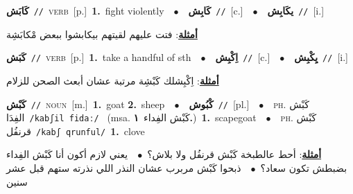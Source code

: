 \documentclass[10pt,a4paper,twoside]{article} %
\begin{document}
\begin{multicols}{2}
{\setlength\topsep{0pt}\textbf{\foreignlanguage{arabic}{كَابَش}}\ {\color{gray}\texttt{//}\color{black}}\ \textsc{verb}\ [p.]\ \textbf{1.}~fight violently\ \ $\bullet$\ \ \setlength\topsep{0pt}\textbf{\foreignlanguage{arabic}{كَابِش}}\ {\color{gray}\texttt{//}\color{black}}\ [c.]\ \ $\bullet$\ \ \setlength\topsep{0pt}\textbf{\foreignlanguage{arabic}{يكَابِش}}\ {\color{gray}\texttt{//}\color{black}}\ [i.]\  \begin{flushright}\color{gray}\foreignlanguage{arabic}{\textbf{\underline{\foreignlanguage{arabic}{أمثلة}}}: فتت عليهم لقيتهم بيكابشوا ببعض مْكابَشِة}\end{flushright}\color{black}} \vspace{2mm}

{\setlength\topsep{0pt}\textbf{\foreignlanguage{arabic}{كَبَش}}\ {\color{gray}\texttt{//}\color{black}}\ \textsc{verb}\ [p.]\ \textbf{1.}~take a handful of sth\ \ $\bullet$\ \ \setlength\topsep{0pt}\textbf{\foreignlanguage{arabic}{اِكْبِش}}\ {\color{gray}\texttt{//}\color{black}}\ [c.]\ \ $\bullet$\ \ \setlength\topsep{0pt}\textbf{\foreignlanguage{arabic}{يِكْبِش}}\ {\color{gray}\texttt{//}\color{black}}\ [i.]\  \begin{flushright}\color{gray}\foreignlanguage{arabic}{\textbf{\underline{\foreignlanguage{arabic}{أمثلة}}}: اِكْبِشلك كَبْشِة مرتبة عشان أبعث الصحن للزلام}\end{flushright}\color{black}} \vspace{2mm}

{\setlength\topsep{0pt}\textbf{\foreignlanguage{arabic}{كَبْش}}\ {\color{gray}\texttt{//}\color{black}}\ \textsc{noun}\ [m.]\ \textbf{1.}~goat  \textbf{2.}~sheep\ \ $\bullet$\ \ \setlength\topsep{0pt}\textbf{\foreignlanguage{arabic}{كْبُوش}}\ {\color{gray}\texttt{//}\color{black}}\ [pl.]\ \ $\bullet$\ \ \textsc{ph.} \color{gray} \foreignlanguage{arabic}{كَبْش الفِدَا}\color{black}\ {\color{gray}\texttt{/{\sffamily kabʃil fidaː}/}\color{black}}\ \color{gray} (msa. \foreignlanguage{arabic}{كَبْش الفِداء}~\foreignlanguage{arabic}{\textbf{١.}})\color{black}\ \textbf{1.}~scapegoat\ \ $\bullet$\ \ \textsc{ph.} \color{gray} \foreignlanguage{arabic}{كَبْش قرنفُل}\color{black}\ {\color{gray}\texttt{/{\sffamily kabʃ qrunful}/}\color{black}}\ \textbf{1.}~clove\  \begin{flushright}\color{gray}\foreignlanguage{arabic}{\textbf{\underline{\foreignlanguage{arabic}{أمثلة}}}: أحط عالطبخة كَبْش قرنفُل ولا بلاش؟\ $\bullet$\ \  يعني لازم أكون أنا كَبْش الفِداء بضبطش تكون سعاد؟\ $\bullet$\ \  ذبحوا كَبْش مربرب عشان النذر اللي نذرته ستهم قبل عشر سنين}\end{flushright}\color{black}} \vspace{2mm}


\end{multicols}
\end{document}
